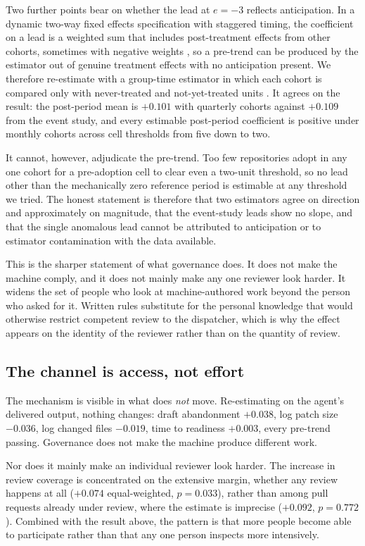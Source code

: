 \documentclass[mnsc]{informs4}
\begin{document}
Two further points bear on whether the lead at $e=-3$ reflects anticipation. In a
dynamic two-way fixed effects specification with staggered timing, the coefficient
on a lead is a weighted sum that includes post-treatment effects from other
cohorts, sometimes with negative weights \citep{sun2021estimating}, so a pre-trend
can be produced by the estimator out of genuine treatment effects with no
anticipation present. We therefore re-estimate with a group-time estimator in
which each cohort is compared only with never-treated and not-yet-treated units
\citep{callaway2021difference}. It agrees on the result: the post-period mean is
$+0.101$ with quarterly cohorts against $+0.109$ from the event study, and every
estimable post-period coefficient is positive under monthly cohorts across cell
thresholds from five down to two.

It cannot, however, adjudicate the pre-trend. Too few repositories adopt in any
one cohort for a pre-adoption cell to clear even a two-unit threshold, so no lead
other than the mechanically zero reference period is estimable at any threshold we
tried. The honest statement is therefore that two estimators agree on direction
and approximately on magnitude, that the event-study leads show no slope, and that
the single anomalous lead cannot be attributed to anticipation or to estimator
contamination with the data available.

This is the sharper statement of what governance does. It does not make the
machine comply, and it does not mainly make any one reviewer look harder. It
widens the set of people who look at machine-authored work beyond the person who
asked for it. Written rules substitute for the personal knowledge that would
otherwise restrict competent review to the dispatcher, which is why the effect
appears on the identity of the reviewer rather than on the quantity of review.

\subsection{The channel is access, not effort}

The mechanism is visible in what does \emph{not} move. Re-estimating on the
agent's delivered output, nothing changes: draft abandonment $+0.038$, log patch
size $-0.036$, log changed files $-0.019$, time to readiness $+0.003$, every
pre-trend passing. Governance does not make the machine produce different work.

Nor does it mainly make an individual reviewer look harder. The increase in review
coverage is concentrated on the extensive margin, whether any review happens at
all ($+0.074$ equal-weighted, $p=0.033$), rather than among pull requests already
under review, where the estimate is imprecise ($+0.092$, $p=0.772$). Combined with
the result above, the pattern is that more people become able to participate
rather than that any one person inspects more intensively.
\end{document}
